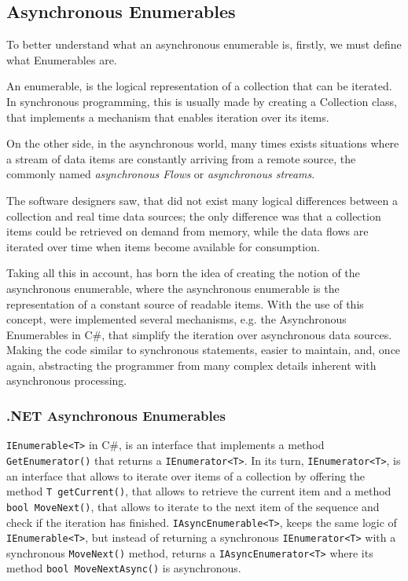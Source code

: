 \subsection{Asynchronous Enumerables}
	\label{sec:aenums}
	To better understand what an asynchronous enumerable is, firstly, we must define what Enumerables are. 
	
	An enumerable, is the logical representation of a collection that can be iterated. 
	In synchronous programming, this is usually made by creating a Collection class, that implements a mechanism that enables iteration over its items.
	
	On the other side, in the asynchronous world, many times exists situations where a stream of data items are constantly arriving from a remote source, the commonly named \textit{asynchronous Flows} or \textit{asynchronous streams}. 
	
	The software designers saw, that did not exist many logical differences between a collection and real time data sources; 
	the only difference was that a collection items could be retrieved on demand from memory, while the data flows are iterated over time when items become available for consumption.

	Taking all this in account, has born the idea of creating the notion of the asynchronous enumerable, where the asynchronous enumerable is the representation of a constant source of readable items.
	With the use of this concept, were implemented several mechanisms, e.g. the Asynchronous Enumerables in C\#, that simplify the iteration over asynchronous data sources. 
	Making the code similar to synchronous statements, easier to maintain, and, once again, abstracting the programmer from many complex details inherent with asynchronous processing.

\subsubsection{.NET Asynchronous Enumerables}
\label{csenums}
	\texttt{IEnumerable<T>} in C\#, is an interface that implements a method \texttt{GetEnumerator()} that returns a \texttt{IEnumerator<T>}. 
	In its turn, \texttt{IEnumerator<T>}, is an interface that allows to iterate over items of a collection by offering the method \texttt{T getCurrent()}, that allows to retrieve the current item 
	and a method \texttt{bool MoveNext()}, that allows to iterate to the next item of the sequence and check if the iteration has finished.
	\texttt{IAsyncEnumerable<T>}, keeps the same logic of \texttt{IEnumerable<T>}, but instead of returning a synchronous \texttt{IEnumerator<T>} with a synchronous \texttt{MoveNext()} method, returns a \texttt{IAsyncEnumerator<T>} where its method \texttt{bool MoveNextAsync()} is asynchronous. 
	
